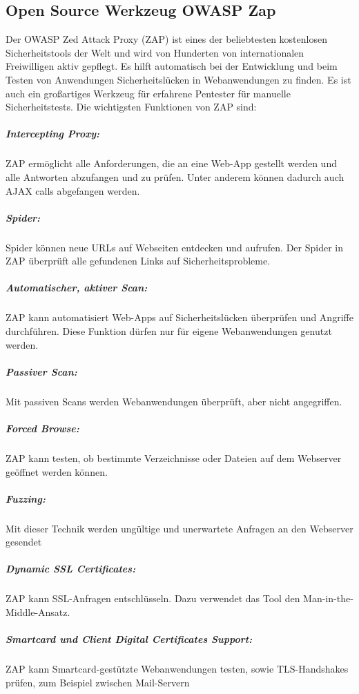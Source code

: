 \subsection{Open Source Werkzeug OWASP Zap}

Der OWASP Zed Attack Proxy (ZAP) ist eines der beliebtesten kostenlosen Sicherheitstools der Welt und wird von Hunderten von internationalen Freiwilligen aktiv gepflegt. Es hilft automatisch bei der Entwicklung und beim Testen von Anwendungen Sicherheitslücken in Webanwendungen zu finden. Es ist auch ein großartiges Werkzeug für erfahrene Pentester für manuelle Sicherheitstests\cite{owasp18def}. Die wichtigsten Funktionen von ZAP sind\cite{owaspfunktionen18}:

\subparagraph{Intercepting Proxy:}

ZAP ermöglicht alle Anforderungen, die an eine Web-App gestellt werden und alle Antworten abzufangen und zu prüfen. Unter anderem können dadurch auch AJAX calls abgefangen werden.

\subparagraph{Spider:}

Spider können neue URLs auf Webseiten entdecken und aufrufen. Der Spider in ZAP überprüft alle gefundenen Links auf Sicherheitsprobleme.

\subparagraph{Automatischer, aktiver Scan:}

ZAP kann automatisiert Web-Apps auf Sicherheitslücken überprüfen und Angriffe durchführen. Diese Funktion dürfen nur für eigene Webanwendungen genutzt werden.

\subparagraph{Passiver Scan:}

Mit passiven Scans werden Webanwendungen überprüft, aber nicht angegriffen.

\subparagraph{Forced Browse:}

ZAP kann testen, ob bestimmte Verzeichnisse oder Dateien auf dem Webserver geöffnet werden können.

\subparagraph{Fuzzing:}

Mit dieser Technik werden ungültige und unerwartete Anfragen an den Webserver gesendet

\subparagraph{Dynamic SSL Certificates:}

ZAP kann SSL-Anfragen entschlüsseln. Dazu verwendet das Tool den Man-in-the-Middle-Ansatz.

\subparagraph{Smartcard und Client Digital Certificates Support:}

ZAP kann Smartcard-gestützte Webanwendungen testen, sowie TLS-Handshakes prüfen, zum Beispiel zwischen Mail-Servern

